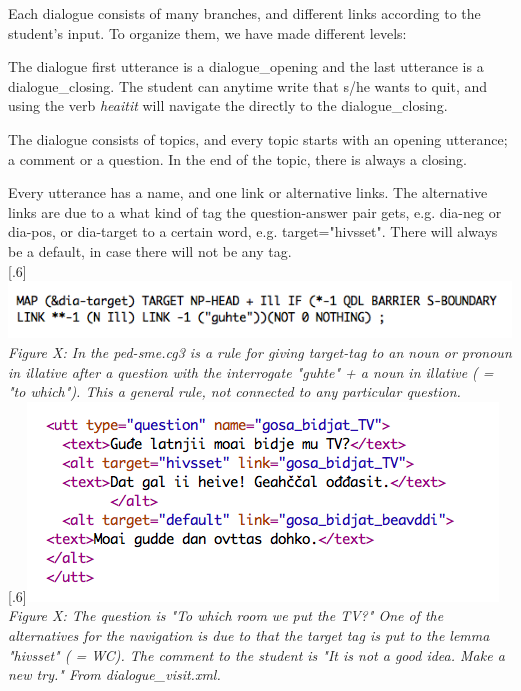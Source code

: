 \documentclass[a4paper,12pt]{article}
\begin{document}
Each dialogue consists of many branches, and different links according to the student's input. To organize them, we have made different levels:

The dialogue first utterance is a dialogue\_opening and the last utterance is a dialogue\_closing. The student can anytime write that s/he wants to quit, and using the verb \textit{heaitit} will navigate the directly to the dialogue\_closing.

The dialogue consists of topics, and every topic starts with an opening utterance; a comment or a question. In the end of the topic, there is always a closing.  


Every utterance has a name, and one link or alternative links. The alternative links are due to a what kind of tag the question-answer pair gets, e.g. dia-neg or dia-pos, or dia-target to a certain word, e.g. target="hivsset". There will always be a default, in case there will not be any tag.\\


\scalebox{.6}[.6]{\includegraphics{img/targetIll.png}}
\\
\textit{Figure X: In the ped-sme.cg3 is a rule for giving target-tag to an noun or pronoun in illative after a question with the interrogate "guhte" + a noun in illative ( = "to which"). This a general rule, not connected to any particular question.}\\ 

\scalebox{.6}[.6]{\includegraphics{img/gosabidjatTV.png}}
\\
\textit{Figure X: The question is "To which room we put the TV?" One of the alternatives for the navigation is due to that the target tag is put to the lemma "hivsset" ( = WC). The comment to the student is "It is not a good idea. Make a new try." From dialogue\_visit.xml.}\\
\end{document}
